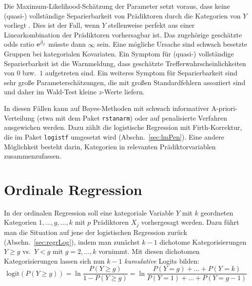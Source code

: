 Die Maximum-Likelihood-Schätzung der Parameter setzt voraus, dass keine (quasi-) vollständige Separierbarkeit von Prädiktoren durch die Kategorien von $Y$ vorliegt \cite{Allison2008, Allison2003}. Dies ist der Fall, wenn $Y$ stellenweise perfekt aus einer Linearkombination der Prädiktoren vorhersagbar ist. Das zugehörige geschätzte odds ratio ${\mathrm{e}}^{\hat{\beta}_{j}}$ müsste dann $\infty$ sein. Eine mögliche Ursache sind schwach besetzte Gruppen bei kategorialen Kovariaten. Ein Symptom für (quasi-) vollständige Separierbarkeit ist die Warnmeldung, dass geschätzte Trefferwahrscheinlichkeiten von $0$ bzw.\ $1$ aufgetreten sind. Ein weiteres Symptom für Separierbarkeit sind sehr große Parameterschätzungen, die mit großen Standardfehlern assoziiert sind und daher im Wald-Test kleine $z$-Werte liefern.

In diesen Fällen kann auf Bayes-Methoden mit schwach informativer A-priori-Verteilung (etwa mit dem Paket \lstinline!rstanarm!) oder auf penalisierte Verfahren ausgewichen werden. Dazu zählt die logistische Regression mit Firth-Korrektur, die im Paket  \lstinline!logistf! \cite{Heinze2013a} umgesetzt wird (Abschn.\ \ref{sec:lmPen}). Eine andere Möglichkeit besteht darin, Kategorien in relevanten Prädiktorvariablen zusammenzufassen.

\section{Ordinale Regression}
\label{sec:regrOrd}

In der ordinalen Regression soll eine kategoriale Variable $Y$ mit $k$ geordneten Kategorien $1, \dots, g, \dots, k$ mit $p$ Prädiktoren $X_{j}$ vorhergesagt werden. Dazu führt man die Situation auf jene der logistischen Regression zurück (Abschn.\ \ref{sec:regrLog}), indem man zunächst $k-1$ dichotome Kategorisierungen $Y \geq g$ vs.\ $Y < g$ mit $g = 2, \ldots, k$ vornimmt. Mit diesen dichotomen Kategorisierungen lassen sich nun $k-1$ \emph{kumulative} Logits bilden:
\begin{equation*}
\text{logit}(P(Y \geq g)) = \ln \frac{P(Y \geq g)}{1 - P(Y \geq g)} = \ln \frac{P(Y=g) + \dots + P(Y=k)}{P(Y=1) + \dots + P(Y=g-1)}
\end{equation*}

